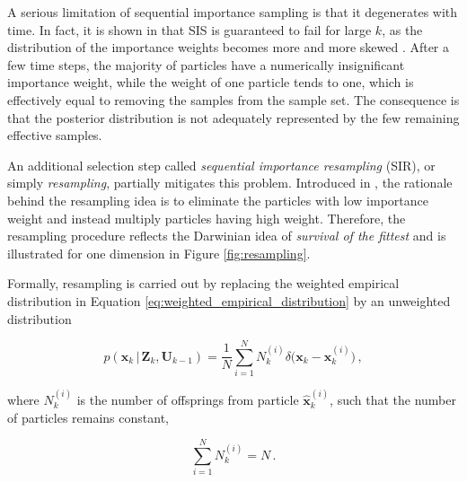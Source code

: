 A serious limitation of sequential importance sampling is that it degenerates with time. In fact, it is shown in \cite{kong1994sequential} that SIS is guaranteed to fail for large $k$, as the distribution of the importance weights becomes more and more skewed \cite{merwe2000scented}. After a few time steps, the majority of particles have a numerically insignificant importance weight, while the weight of one particle tends to one, which is effectively equal to removing the samples from the sample set. The consequence is that the posterior distribution is not adequately represented by the few remaining effective samples.

An additional selection step called \emph{sequential importance resampling} (SIR), or simply \emph{resampling}, partially mitigates this problem. Introduced in \cite{gordon1993novel}, the rationale behind the resampling idea is to eliminate the particles with low importance weight and instead multiply particles having high weight. Therefore, the resampling procedure reflects the Darwinian idea of \emph{survival of the fittest} and is illustrated for one dimension in Figure \ref{fig:resampling}. 

Formally, resampling is carried out by replacing the weighted empirical distribution in Equation \ref{eq:weighted_empirical_distribution} by an unweighted distribution

\begin{equation}
  p(\bm{x}_k\,|\,\bm{Z}_{k}, \bm{U}_{k-1}) = \frac{1}{N} \sum^N_{i = 1} N_k^{(i)}  \delta\Big(\bm{x}_{k} - \bm{x}^{(i)}_k \Big) \,,
\end{equation}

\noindent
where $N_k^{(i)}$ is the number of offsprings from particle $\hat{\bm{x}}^{(i)}_k$, such that the number of particles remains constant,

\begin{equation}
  \sum^N_{i = 1} N_k^{(i)} = N  \,.
\end{equation}

